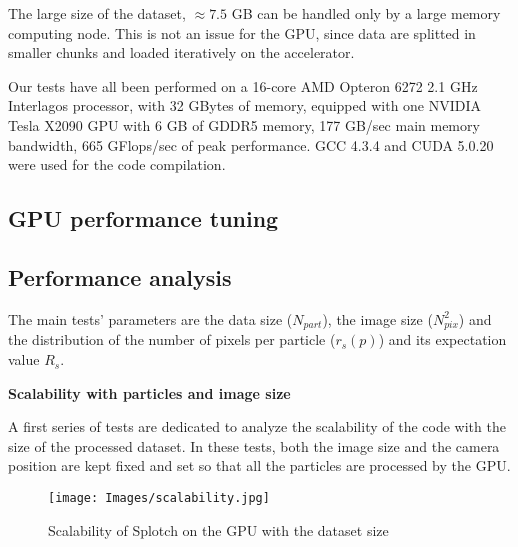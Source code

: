 \documentclass[11pt]{article}
\begin{document}
The large size of the dataset, $\approx 7.5$ GB can be handled only by a large memory computing node. 
This is not an issue for the GPU, since data are splitted 
in smaller chunks and loaded iteratively on the accelerator. 

Our tests have all been performed on a 16-core AMD Opteron 6272 2.1 GHz Interlagos processor,
with 32 GBytes of memory, equipped with one NVIDIA Tesla X2090 GPU with 6 GB of GDDR5 memory,
177 GB/sec 
main memory bandwidth, 665 GFlops/sec of peak performance. GCC 4.3.4 and CUDA 5.0.20 
were used for the code compilation.

\subsection{GPU performance tuning}


\subsection{Performance analysis}

The main tests' parameters are the data size ($N_{part}$),
the image size ($N_{pix}^2$) and the distribution of the number of pixels 
per particle ($r_s(p)$) and its expectation value $R_s$.

\medskip
\noindent 
{\bf Scalability with particles and image size}

A first series of tests are dedicated to analyze the scalability of the code
with the size of the processed dataset. In these tests, both the image size
and the camera position are kept fixed and set so that all the particles are processed 
by the GPU.

\begin{figure}
\centering
\texttt{[image: Images/scalability.jpg]}
\caption{Scalability of Splotch on the GPU with the dataset size}
\label{fig:scalability}
\end{figure}
\end{document}
